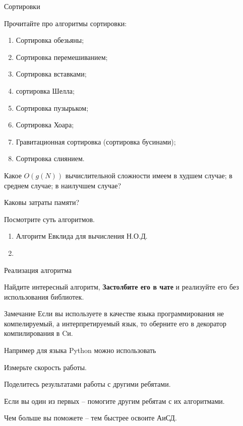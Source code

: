 \begin{frame}{Сортировки}
	
	Прочитайте про алгоритмы сортировки:
	\begin{enumerate}
		\item Сортировка обезьяны;
		\item Сортировка перемешиванием;
		\item Сортировка вставками;
		\item сортировка Шелла;
		\item Сортировка пузырьком;
		\item Сортировка Хоара;
		\item Гравитационная сортировка (сортировка бусинами);
		\item Сортировка слиянием.
	\end{enumerate}
	
	Какое $O(g(N))$ вычислительной сложности
	имеем 
	в худшем случае; 
	в среднем случае; 
	в наилучшем случае?
	
	Каковы затраты памяти?
	
	
\end{frame}


\begin{frame}
	Посмотрите суть алгоритмов.
	
	\begin{enumerate}
		\item Алгоритм Евклида для вычисления Н.О.Д.
		\item %
	\end{enumerate}
\end{frame}


\begin{frame}{Реализация алгоритма}
	
	Найдите интересный алгоритм, 	\textbf{Застолбите его в чате} и реализуйте его без использования библиотек.
	
	\begin{block}{Замечание}
		Если вы используете в качестве языка программирования не компелируемый, а интерпретируемый язык,
		то оберните его в декоратор компилирования в Cи.
		
		Например для языка Python можно использовать 
	\end{block}
	
	Измерьте скорость работы.
	
	Поделитесь результатами работы с другими ребятами.
	
	Если вы один из первых -- помогите другим ребятам с их алгоритмами.
	
	Чем больше вы поможете -- тем быстрее освоите АиСД.
	
	
\end{frame}


